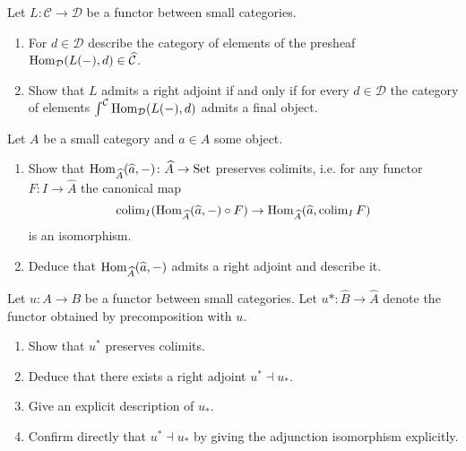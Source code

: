 \begin{Exercise}
    Let $ L \colon \mathcal{ C } \to \mathcal{ D } $ be a functor between small categories.
    
    \begin{enumerate}[label=(\alph*)]
        \item 
        For $ d \in \mathcal{ D } $ describe the category of elements of the presheaf $\operatorname{Hom}_{\mathcal{ D } } ( L ( - ) , d ) \in \widehat{ \mathcal{ C } }$.
    
        \item 
        Show that $ L $ admits a right adjoint if and only if for every $d \in \mathcal{ D } $ the category of elements $ \int^{ \mathcal{ C } } \operatorname{Hom}_{ \mathcal{ D } } ( L ( - ) , d ) $ admits a final object.
    \end{enumerate}
\end{Exercise}

\begin{Exercise}
    Let $ A $ be a small category and $ a \in A $ some object.
    
    \begin{enumerate}[label=(\alph*)]
        \item 
        Show that $ \operatorname{Hom}_{\widehat{A}}( \widehat{a} , - ) \colon \widehat{A} \to \operatorname{Set} $ preserves colimits, i.e. for any functor $ F \colon I \to \widehat{ A } $ the canonical map 
        \[
            \operatorname{colim}_I ( \operatorname{Hom}_{ \widehat{ A } } ( \widehat{ a } , - ) \circ F ) \to \operatorname{Hom}_{ \widehat{ A } }( \widehat{ a }, \operatorname{colim}_I F )
        \]
        is an isomorphism.
    
        \item 
        Deduce that $\operatorname{Hom}_{\widehat{A}} ( \widehat{a} , - ) $ admits a right adjoint and describe it.
    \end{enumerate}
\end{Exercise}

\begin{Exercise}
    Let $ u \colon A \to  B $ be a functor between small categories. 
    Let $ u* \colon \widehat{ B } \to \widehat{ A } $ denote the functor obtained by precomposition with $ u $.
    
    \begin{enumerate}[label=(\alph*)]
        \item 
        Show that $u^*$ preserves colimits.
    
        \item 
        Deduce that there exists a right adjoint $ u^* \dashv u_* $.
    
        \item 
        Give an explicit description of $ u _*$.
    
        \item 
        Confirm directly that $ u^* \dashv u_* $ by giving the adjunction isomorphism explicitly.
    \end{enumerate}
\end{Exercise}

